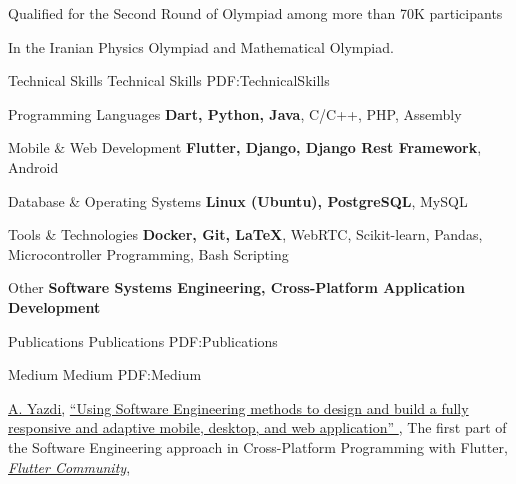 \documentclass[letterpaper,MMMyyyy,nonstopmode]{resume}
\begin{document}
\begin{Body}
\Gap
\BulletItem
Qualified for the Second Round of Olympiad
among more than 70K participants
\hfill
\textsl{\small{}}
\begin{Detail}
\SubBulletItem
In the Iranian Physics Olympiad and Mathematical Olympiad.
\end{Detail}


\Section
{Technical Skills}
{Technical Skills}
{PDF:TechnicalSkills}

\BulletItem
Programming Languages
\SubBulletItem
\textbf{Dart, Python, Java}, C/C++, PHP, Assembly

\Gap
\BulletItem
Mobile \& Web Development
\SubBulletItem
\textbf{Flutter, Django, Django Rest Framework}, Android


\Gap
\BulletItem
Database \& Operating Systems
\SubBulletItem
\textbf{Linux (Ubuntu), PostgreSQL}, MySQL

\Gap
\BulletItem
Tools \& Technologies
\SubBulletItem
\textbf{Docker, Git, \LaTeX}, WebRTC, Scikit-­learn, Pandas, Microcontroller Programming, Bash Scripting

\Gap
\BulletItem
Other
\SubBulletItem
\textbf{Software Systems Engineering, Cross-Platform Application Development}



\newpage


\Section
{Publications}
{Publications}
{PDF:Publications}

\SubSection
{Medium}
{Medium}
{PDF:Medium}

\begingroup
\renewcommand{\MaxNumberedItem}{[88]}

\NumberedItem{[1]}
\href{https://medium.com/@aliyazdi75}
{\underline{A. Yazdi}},
\href{https://medium.com/flutter-community/the-software-engineering-approach-in-cross-platform-programming-with-flutter-part-1-efcdc8a8fc26?source=friends_link&sk=ceb60f56685ce66c7f9574595748f25b}
{
``Using Software Engineering methods to design and build a fully responsive and adaptive mobile, desktop, and web application''
},
\newline The first part of the Software Engineering approach in Cross-Platform Programming with Flutter,
\href{https://medium.com/flutter-community}
{\textit{Flutter Community}},


\end{Body}
\end{document}
